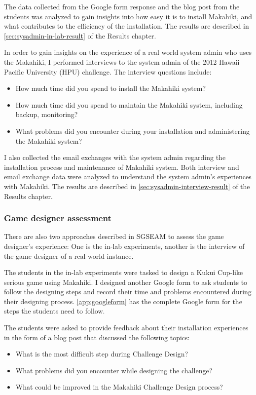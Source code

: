 The data collected from the Google form response and the blog post from the students was analyzed to gain insights into how easy it is to install Makahiki, and what contributes to the efficiency of the installation. The results are described in \autoref{sec:sysadmin-in-lab-result} of the Results chapter.

In order to gain insights on the experience of a real world system admin who uses the Makahiki, I performed interviews to the system admin of the 2012 Hawaii Pacific University (HPU) challenge. The interview questions include:
\begin{itemize}
 \item How much time did you spend to install the Makahiki system?
 \item How much time did you spend to maintain the Makahiki system, including backup, monitoring?
 \item What problems did you encounter during your installation and administering the Makahiki system?
\end{itemize}

I also collected the email exchanges with the system admin regarding the installation process and maintenance of Makahiki system. Both interview and email exchange data were analyzed to understand the system admin's experiences with Makahiki.  The results are described in \autoref{sec:sysadmin-interview-result} of the Results chapter.

\subsubsection{Game designer assessment}

There are also two approaches described in SGSEAM to assess the game designer's experience: One is the in-lab experiments, another is the interview of the game designer of a real world instance.

The students in the in-lab experiments were tasked to design a Kukui Cup-like serious game using Makahiki. I designed another Google form to ask students to follow the designing steps and record their time and problems encountered during their designing process. \autoref{app:googleform} has the complete Google form for the steps the students need to follow.

The students were asked to provide feedback about their installation experiences in the form of a blog post that discussed the following topics:
\begin{itemize}
\item What is the most difficult step during Challenge Design?
\item What problems did you encounter while designing the challenge?
\item What could be improved in the Makahiki Challenge Design process?
\end{itemize}

